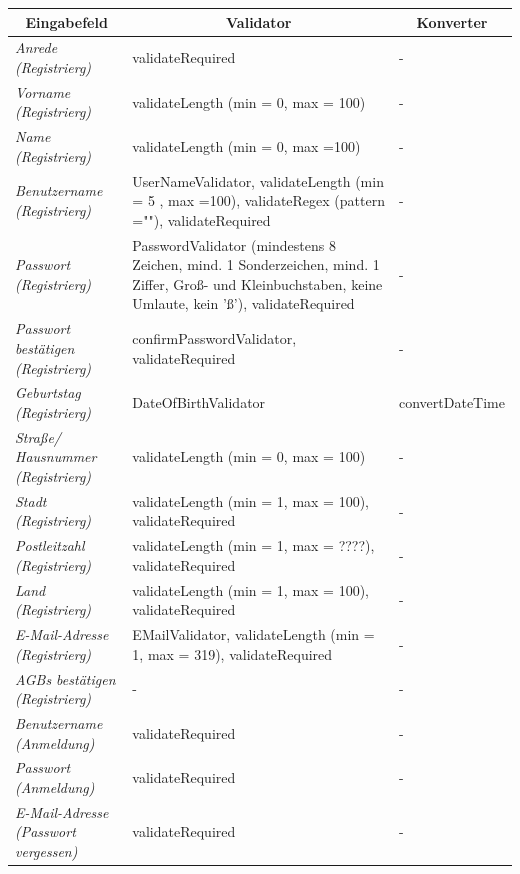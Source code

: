 \begin{itemize}
\begin{itemize}
\begin{center}
\begin{longtable}{|p{3cm} |p{8cm} | p{5cm}|}
						\hline \multicolumn{1}{|c|}{\textbf{Eingabefeld}} & \multicolumn{1}{|c|}{\textbf{Validator}} & \multicolumn{1}{|c|}{\textbf{Konverter}} \\ \hline
						\endfirsthead
						\hline
						\endlastfoot
						\textit{Anrede (Registrierg)} & validateRequired & -  \\ \hline
						\textit{Vorname (Registrierg)} & validateLength (min = 0, max = 100) & - \\ \hline
						\textit{Name (Registrierg)} & validateLength (min = 0, max =100) & -  \\ \hline
						\textit{Benutzername (Registrierg)} & UserNameValidator, validateLength (min = 5 , max =100), validateRegex (pattern =""), validateRequired  & - \\ \hline
						\textit{Passwort (Registrierg)} & PasswordValidator (mindestens 8 Zeichen, mind. 1 Sonderzeichen, mind. 1 Ziffer, Groß- und Kleinbuchstaben, keine Umlaute, kein 'ß'), validateRequired & -  \\ \hline
						\textit{Passwort bestätigen (Registrierg)} & confirmPasswordValidator, validateRequired & - \\ \hline
						\textit{Geburtstag (Registrierg)} & DateOfBirthValidator & convertDateTime  \\ \hline
						\textit{Straße/ Hausnummer (Registrierg)} & validateLength (min = 0, max = 100) & - \\ \hline
						\textit{Stadt (Registrierg)} & validateLength (min = 1, max = 100), validateRequired & -  \\ \hline
						\textit{Postleitzahl (Registrierg)} & validateLength (min = 1, max = ????), validateRequired & - \\ \hline
						\textit{Land (Registrierg)} & validateLength (min = 1, max = 100), validateRequired & -  \\ \hline
						\textit{E-Mail-Adresse (Registrierg)} & EMailValidator, validateLength (min = 1, max = 319), validateRequired & - \\ \hline
						\textit{AGBs bestätigen (Registrierg)} & - & -  \\ \hline
						\textit{Benutzername (Anmeldung)} & validateRequired & - \\ \hline
						\textit{Passwort (Anmeldung)} & validateRequired & -  \\ \hline
						\textit{E-Mail-Adresse (Passwort vergessen)} & validateRequired & - \\ \hline
					\end{longtable}
				\end{center}
				

\end{itemize}
\end{itemize}
